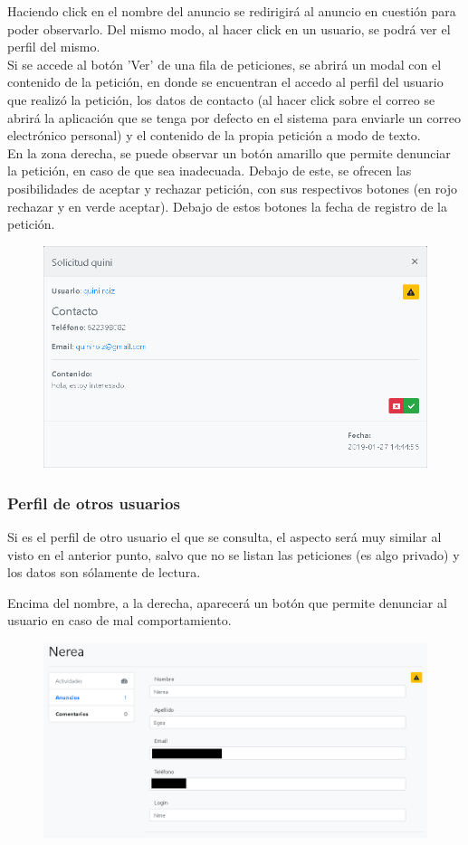 Haciendo click en el nombre del anuncio se redirigir\'{a} al anuncio en cuesti\'{o}n para poder observarlo. Del mismo modo, al hacer click en un usuario, se podr\'{a} ver el perfil del mismo. \\


Si se accede al bot\'{o}n 'Ver' de una fila de peticiones, se abrir\'{a} un modal con el contenido de la petici\'{o}n, en donde se encuentran el accedo al perfil del usuario que realiz\'{o} la petici\'{o}n, los datos de contacto (al hacer click sobre el correo se abrir\'{a} la aplicaci\'{o}n que se tenga por defecto en el sistema para enviarle un correo electr\'{o}nico personal) y el contenido de la propia petici\'{o}n a modo de texto. \\

En la zona derecha, se puede observar un bot\'{o}n amarillo que permite denunciar la petici\'{o}n, en caso de que sea inadecuada. Debajo de este, se ofrecen las posibilidades de aceptar y rechazar petici\'{o}n, con sus respectivos botones (en rojo rechazar y en verde aceptar). Debajo de estos botones la fecha de registro de la petici\'{o}n.

\begin{figure}[h!]
\centering
\includegraphics[width=.6\textwidth]{Img/ManualUsuario/USER_REQUEST_READ.png}
\end{figure}

\subsubsection{Perfil de otros usuarios}
Si es el perfil de otro usuario el que se consulta, el aspecto ser\'{a} muy similar al visto en el anterior punto, salvo que no se listan las peticiones (es algo privado) y los datos son s\'{o}lamente de lectura. 

Encima del nombre, a la derecha, aparecer\'{a} un bot\'{o}n que permite denunciar al usuario en caso de mal comportamiento. \\

\begin{figure}[h!]
\centering
\includegraphics[width=.8\textwidth, height=.2\textheight]{Img/ManualUsuario/PERFIL_OTHER.png}
\end{figure}

